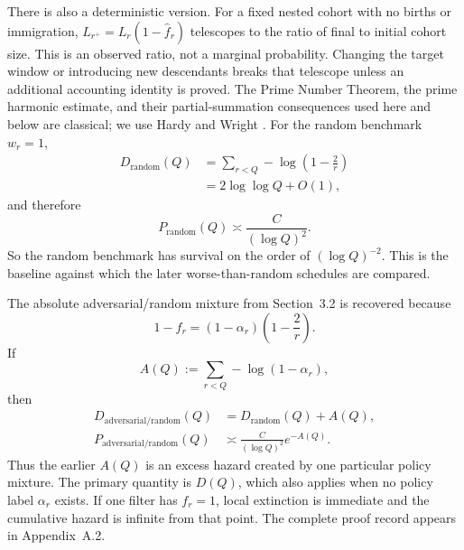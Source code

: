 There is also a deterministic version. For a fixed nested cohort with no births or immigration, $L_{r^+}=L_r(1-\widehat f_r)$ telescopes to the ratio of final to initial cohort size. This is an observed ratio, not a marginal probability. Changing the target window or introducing new descendants breaks that telescope unless an additional accounting identity is proved.
The Prime Number Theorem, the prime harmonic estimate, and their partial-summation consequences used here and below are classical; we use Hardy and Wright \cite{hardywright2008}.
For the random benchmark $w_r=1$,
\begin{equation*}
\begin{aligned}
D_{\mathrm{random}}(Q)
&=\sum_{r < Q}-\log\left(1-\frac2r\right)\\
&=2\log\log Q+O(1),
\end{aligned}
\end{equation*}
and therefore
\begin{equation*}
P_{\mathrm{random}}(Q)
\asymp\frac{C}{(\log Q)^2}.
\end{equation*}
So the random benchmark has survival on the order of $(\log Q)^{-2}$. This is the baseline against which the later worse-than-random schedules are compared.

The absolute adversarial/random mixture from Section~3.2 is recovered because
\begin{equation*}
1-f_r
=(1-\alpha_r)\left(1-\frac2r\right).
\end{equation*}
If
\begin{equation*}
A(Q):=\sum_{r < Q}-\log(1-\alpha_r),
\end{equation*}
then
\begin{equation*}
\begin{aligned}
D_{\mathrm{adversarial/random}}(Q)
&=D_{\mathrm{random}}(Q)+A(Q),\\
P_{\mathrm{adversarial/random}}(Q)
&\asymp\frac{C}{(\log Q)^2}e^{-A(Q)}.
\end{aligned}
\end{equation*}
Thus the earlier $A(Q)$ is an excess hazard created by one particular policy mixture. The primary quantity is $D(Q)$, which also applies when no policy label $\alpha_r$ exists.
If one filter has $f_r=1$, local extinction is immediate and the cumulative hazard is infinite from that point.
The complete proof record appears in Appendix~A.2.
